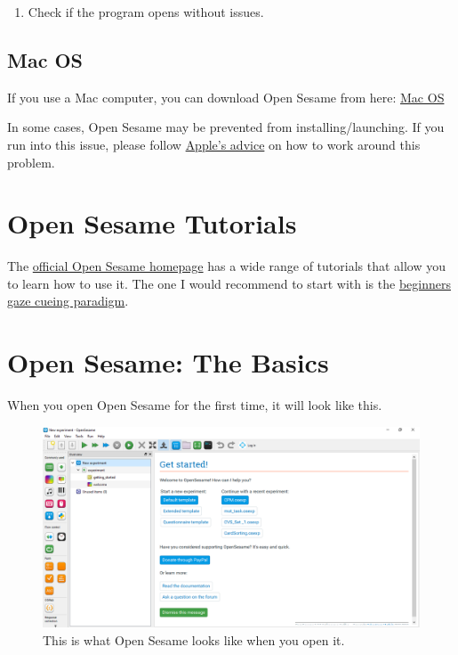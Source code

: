 \documentclass[
]{book}
\providecommand{\tightlist}{%
  \setlength{\itemsep}{0pt}\setlength{\parskip}{0pt}}
\begin{document}
\begin{enumerate}
\def\labelenumi{\arabic{enumi}.}
\setcounter{enumi}{2}
\tightlist
\item
  Check if the program opens without issues.
\end{enumerate}

\hypertarget{mac-os}{%
\subsection{Mac OS}\label{mac-os}}

If you use a Mac computer, you can download Open Sesame from here:
\href{https://github.com/open-cogsci/OpenSesame/releases/download/release\%2F3.3.2/opensesame_3.3.2-py37-macos-1.dmg}{Mac OS}

In some cases, Open Sesame may be prevented from installing/launching. If you run into this issue, please follow \href{https://support.apple.com/en-in/guide/mac-help/mh40616/mac}{Apple's advice} on how to work around this problem.

\hypertarget{open-sesame-tutorials}{%
\section{Open Sesame Tutorials}\label{open-sesame-tutorials}}

The \href{osdoc.cogsci.nl}{official Open Sesame homepage} has a wide range of tutorials that allow you to learn how to use it. The one I would recommend to start with is the \href{https://osdoc.cogsci.nl/3.3/tutorials/beginner/}{beginners gaze cueing paradigm}.

\hypertarget{open-sesame-the-basics}{%
\section{Open Sesame: The Basics}\label{open-sesame-the-basics}}

When you open Open Sesame for the first time, it will look like this.

\begin{figure}

{\centering \includegraphics[width=0.85\linewidth]{images/opensesame/OpenSesameopen} 

}

\caption{This is what Open Sesame looks like when you open it.}\label{fig:Figure12-2}
\end{figure}
\end{document}
